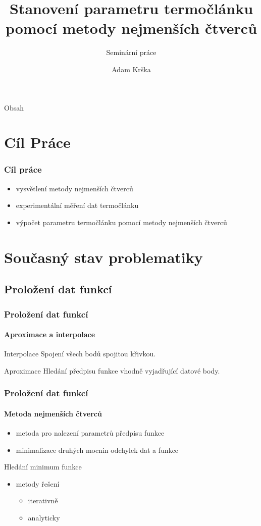 \documentclass[smaller,aspectratio=1610,handout]{beamer}
\author[A. Krška]{Adam Krška}
\title[Stanovení parametru termočlánku]{Stanovení parametru termočlánku pomocí
metody nejmenších čtverců}
\subtitle{Seminární práce}
\institute[GSS Mikulov]{Gymnázium a střední odborná škola Mikulov}
\date{}
\newcommand\sumi{\sum_{i=1}^n}
\begin{document}
\frame[plain]{\titlepage}

\begin{frame}{Obsah}
	\tableofcontents
\end{frame}
\section{Cíl Práce}

\begin{frame}
	\frametitle{Cíl práce}
	\begin{itemize}
		\item vysvětlení metody nejmenších čtverců
		\item experimentální měření dat termočlánku
		\item výpočet parametru termočlánku pomocí metody nejmenších čtverců
	\end{itemize}	
\end{frame}

\section{Současný stav problematiky}
\subsection{Proložení dat funkcí}

\begin{frame}
	\frametitle{Proložení dat funkcí}
	\framesubtitle{Aproximace a interpolace}
	
	\begin{block}{Interpolace}
		Spojení všech bodů spojitou křivkou.	
	\end{block}

	\begin{block}{Aproximace}
		Hledání předpisu funkce vhodně vyjadřující datové body.	
	\end{block}
\end{frame}

\begin{frame}
	\frametitle{Proložení dat funkcí}
	\framesubtitle{Metoda nejmenších čtverců}
	\begin{itemize}
		\item metoda pro nalezení parametrů předpisu funkce
		\item minimalizace druhých mocnin odchylek dat a funkce 
	\end{itemize}
	\begin{block}{Hledání minimum funkce}
	\vspace*{-0.2\baselineskip}\setlength\belowdisplayshortskip{0pt}
	\eq{S=\sumi\(y_i-f(x_i)\)^2}
	\end{block}

	\begin{itemize}
		\item metody řešení
			\begin{itemize}
				\item iterativně
				\item analyticky
			\end{itemize}
	\end{itemize}
\end{frame}
\end{document}
